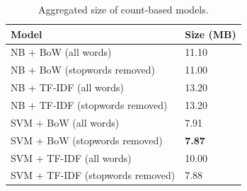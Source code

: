 \documentclass[a4paper,twoside,phd]{BYUPhys}
\begin{document}
\begin{table}[H]
	\centering
	\caption{Aggregated size of count-based models.}	
	\begin{tabular}{|p{4.2cm}|p{5cm}|}
		\hline
		
		\textbf{Model} & \textbf{Size (MB)}                                                                                                                                                                                                                                                                                                                                                    \\
		\hline                                                                                                                                              
		
		NB + BoW (all words)  & 11.10  \\
		\hline
		
		NB + BoW \newline (stopwords  removed)  & 11.00 \\
		\hline
		
		NB + TF-IDF \newline (all words) & 13.20 \\
		\hline
		
		NB + TF-IDF \newline (stopwords removed) & 13.20 \\
		\hline
		
		SVM + BoW  (all words)  & 7.91  \\
		\hline
		
		SVM + BoW \newline (stopwords removed)  & \textbf{7.87}  \\
		\hline
		
		SVM + TF-IDF \newline (all words) & 10.00 \\
		\hline
		
		SVM + TF-IDF \newline (stopwords removed) & 7.88 \\
		\hline
		

		
		
	\end{tabular}
	\label{table:CountStorageRequirements}
\end{table}
\end{document}
